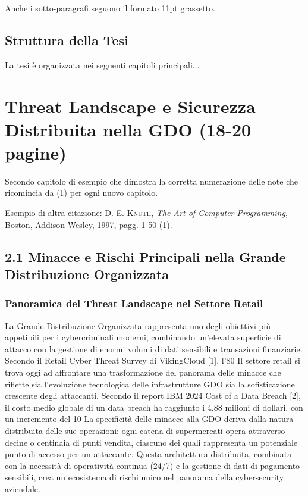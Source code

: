 \documentclass[12pt,a4paper,oneside]{book}
\newcommand{\autore}[1]{\textsc{#1}}
\newcommand{\citlibro}[6]{%
    \autore{#1}, \textit{#2}, #3, #4, #5, pagg. #6%
}
\begin{document}
Anche i sotto-paragrafi seguono il formato 11pt grassetto.

\section{Struttura della Tesi}

La tesi è organizzata nei seguenti capitoli principali...

\chapter{Threat Landscape e Sicurezza Distribuita nella GDO (18-20 pagine)}

Secondo capitolo di esempio che dimostra la corretta numerazione delle note che ricomincia da (1) per ogni nuovo capitolo.

Esempio di altra citazione: \citlibro{D. E. Knuth}{The Art of Computer Programming}{Boston}{Addison-Wesley}{1997}{1-50}(1).
\section{2.1 Minacce e Rischi Principali nella Grande Distribuzione Organizzata}
\subsection{Panoramica del Threat Landscape nel Settore Retail}
La Grande Distribuzione Organizzata rappresenta uno degli obiettivi più appetibili per i cybercriminali moderni, combinando un'elevata superficie di attacco con la gestione di enormi volumi di dati sensibili e transazioni finanziarie. Secondo il Retail Cyber Threat Survey di VikingCloud [1], l'80%
Il settore retail si trova oggi ad affrontare una trasformazione del panorama delle minacce che riflette sia l'evoluzione tecnologica delle infrastrutture GDO sia la sofisticazione crescente degli attaccanti. Secondo il report IBM 2024 Cost of a Data Breach [2], il costo medio globale di un data breach ha raggiunto i 4,88 milioni di dollari, con un incremento del 10%
La specificità delle minacce alla GDO deriva dalla natura distribuita delle sue operazioni: ogni catena di supermercati opera attraverso decine o centinaia di punti vendita, ciascuno dei quali rappresenta un potenziale punto di accesso per un attaccante. Questa architettura distribuita, combinata con la necessità di operatività continua (24/7) e la gestione di dati di pagamento sensibili, crea un ecosistema di rischi unico nel panorama della cybersecurity aziendale.
\end{document}
